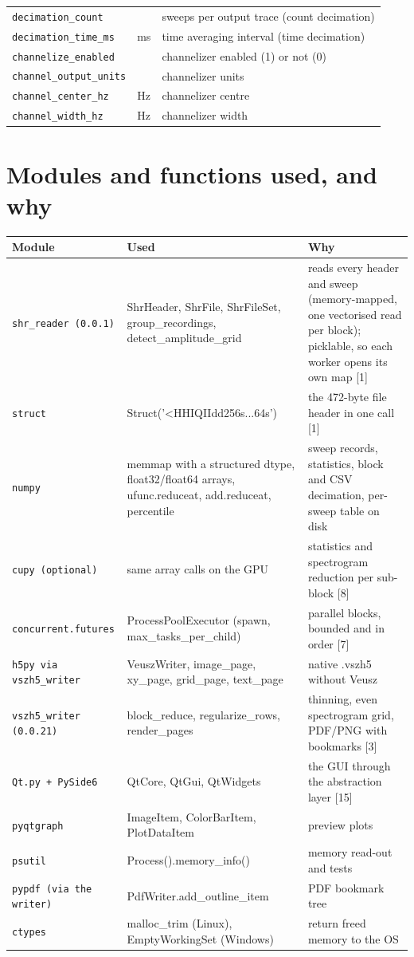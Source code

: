 \documentclass[11pt,a4paper]{article}
\begin{document}
\begin{longtable}{p{4.4cm}p{2.2cm}p{8.6cm}}
\texttt{decimation\_\allowbreak{}count} &  & sweeps per output trace (count decimation)\\
\texttt{decimation\_\allowbreak{}time\_\allowbreak{}ms} & ms & time averaging interval (time decimation)\\
\texttt{channelize\_\allowbreak{}enabled} &  & channelizer enabled (1) or not (0)\\
\texttt{channel\_\allowbreak{}output\_\allowbreak{}units} &  & channelizer units\\
\texttt{channel\_\allowbreak{}center\_\allowbreak{}hz} & Hz & channelizer centre\\
\texttt{channel\_\allowbreak{}width\_\allowbreak{}hz} & Hz & channelizer width\\
\bottomrule
\end{longtable}
\section{Modules and functions used, and why}
\begin{longtable}{p{3.8cm}p{5.2cm}p{6.4cm}}
\toprule
\textbf{Module} & \textbf{Used} & \textbf{Why}\\
\midrule
\endhead
\texttt{shr\_\allowbreak{}reader (0.0.1)} & ShrHeader, ShrFile, ShrFileSet, group\_recordings, detect\_amplitude\_grid & reads every header and sweep (memory-mapped, one vectorised read per block); picklable, so each worker opens its own map [1]\\
\texttt{struct} & Struct('\textless{}HHIQIIdd256s...64s') & the 472-byte file header in one call [1]\\
\texttt{numpy} & memmap with a structured dtype, float32/float64 arrays, ufunc.reduceat, add.reduceat, percentile & sweep records, statistics, block and CSV decimation, per-sweep table on disk\\
\texttt{cupy (optional)} & same array calls on the GPU & statistics and spectrogram reduction per sub-block [8]\\
\texttt{concurrent.futures} & ProcessPoolExecutor (spawn, max\_tasks\_per\_child) & parallel blocks, bounded and in order [7]\\
\texttt{h5py via vszh5\_\allowbreak{}writer} & VeuszWriter, image\_page, xy\_page, grid\_page, text\_page & native .vszh5 without Veusz\\
\texttt{vszh5\_\allowbreak{}writer (0.0.21)} & block\_reduce, regularize\_rows, render\_pages & thinning, even spectrogram grid, PDF/PNG with bookmarks [3]\\
\texttt{Qt.py + PySide6} & QtCore, QtGui, QtWidgets & the GUI through the abstraction layer [15]\\
\texttt{pyqtgraph} & ImageItem, ColorBarItem, PlotDataItem & preview plots\\
\texttt{psutil} & Process().memory\_info() & memory read-out and tests\\
\texttt{pypdf (via the writer)} & PdfWriter.add\_outline\_item & PDF bookmark tree\\
\texttt{ctypes} & malloc\_trim (Linux), EmptyWorkingSet (Windows) & return freed memory to the OS\\
\bottomrule
\end{longtable}
\end{document}
